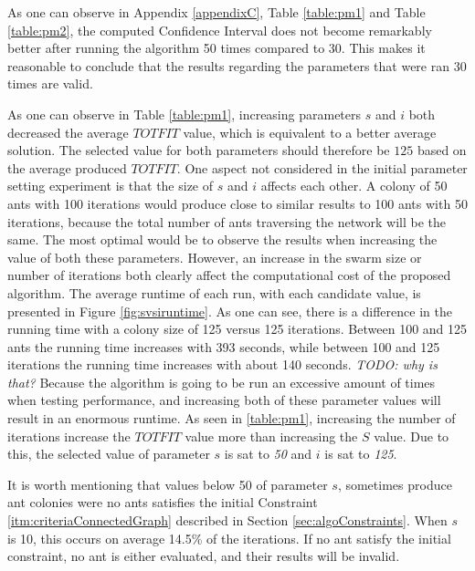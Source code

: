 As one can observe in Appendix \ref{appendixC}, Table \vref{table:pm1} and Table \vref{table:pm2}, the computed Confidence Interval does not become remarkably better after running the algorithm 50 times compared to 30. This makes it reasonable to conclude that the results regarding the parameters that were ran 30 times are valid.
\newline

As one can observe in Table \vref{table:pm1}, increasing parameters $s$ and $i$ both decreased the average $TOTFIT$ value, which is equivalent to a better average solution. The selected value for both parameters should therefore be $125$ based on the average produced $TOTFIT$. One aspect not considered in the initial parameter setting experiment is that the size of $s$ and $i$ affects each other. A colony of 50 ants with 100 iterations would produce close to similar results to 100 ants with 50 iterations, because the total number of ants traversing the network will be the same. The most optimal would be to observe the results when increasing the value of both these parameters. However, an increase in the swarm size or number of iterations both clearly affect the computational cost of the proposed algorithm. The average runtime of each run, with each candidate value, is presented in Figure \vref{fig:svsiruntime}. As one can see, there is a difference in the running time with a colony size of 125 versus 125 iterations. Between 100 and 125 ants the running time increases with 393 seconds, while between 100 and 125 iterations the running time increases with about 140 seconds. \emph{\color{blue}TODO: why is that?} Because the algorithm is going to be run an excessive amount of times when testing performance, and increasing both of these parameter values will result in an enormous runtime. As seen in \ref{table:pm1}, increasing the number of iterations increase the $TOTFIT$ value more than increasing the $S$ value. Due to this, the selected value of parameter $s$ is sat to \textit{50} and $i$ is sat to \textit{125}.

It is worth mentioning that values below 50 of parameter $s$, sometimes produce ant colonies were no ants satisfies the initial Constraint \ref{itm:criteriaConnectedGraph} described in Section \vref{sec:algoConstraints}. When $s$ is 10, this occurs on average 14.5\% of the iterations. If no ant satisfy the initial constraint, no ant is either evaluated, and their results will be invalid. 

